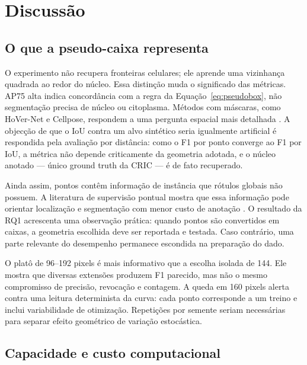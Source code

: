 ﻿\FloatBarrier
\section{Discuss\~ao}

\subsection{O que a pseudo-caixa representa}

O experimento n\~ao recupera fronteiras celulares; ele aprende uma vizinhan\c{c}a
quadrada ao redor do n\'ucleo. Essa distin\c{c}\~ao muda o significado das
m\'etricas. AP75 alta indica concord\^ancia com a regra da
Equa\c{c}\~ao~\ref{eq:pseudobox}, n\~ao segmenta\c{c}\~ao precisa de n\'ucleo ou
citoplasma. M\'etodos com m\'ascaras, como HoVer-Net e Cellpose, respondem a uma
pergunta espacial mais detalhada \cite{graham2019hovernet,stringer2021cellpose}.
A objec\c{c}\~ao de que o IoU contra um alvo sint\'etico seria igualmente
artificial \'e respondida pela avalia\c{c}\~ao por dist\^ancia: como o F1 por ponto
converge ao F1 por IoU, a m\'etrica n\~ao depende criticamente da geometria
adotada, e o n\'ucleo anotado --- \'unico ground truth da CRIC --- \'e de fato
recuperado.

Ainda assim, pontos cont\^em informa\c{c}\~ao de inst\^ancia que r\'otulos globais
n\~ao possuem. A literatura de supervis\~ao pontual mostra que essa informa\c{c}\~ao
pode orientar localiza\c{c}\~ao e segmenta\c{c}\~ao com menor custo de anota\c{c}\~ao
\cite{ribera2019locating,chen2021sparsepoints,xia2023colorization}. O resultado
da RQ1 acrescenta uma observa\c{c}\~ao pr\'atica: quando pontos s\~ao convertidos em
caixas, a geometria escolhida deve ser reportada e testada. Caso contr\'ario, uma
parte relevante do desempenho permanece escondida na prepara\c{c}\~ao do dado.

O plat\^o de 96--192 pixels \'e mais informativo que a escolha isolada de 144.
Ele mostra que diversas extens\~oes produzem F1 parecido, mas n\~ao o mesmo
compromisso de precis\~ao, revoca\c{c}\~ao e contagem. A queda em 160 pixels alerta
contra uma leitura determinista da curva: cada ponto corresponde a um treino e
inclui variabilidade de otimiza\c{c}\~ao. Repeti\c{c}\~oes por semente seriam
necess\'arias para separar efeito geom\'etrico de varia\c{c}\~ao estoc\'astica.

\subsection{Capacidade e custo computacional}

